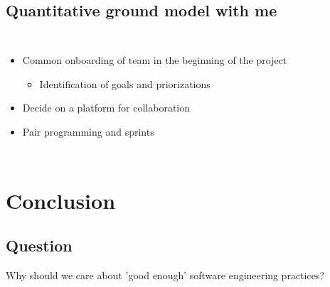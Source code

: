 \documentclass[usenames,dvipsnames]{beamer}
\theoremstyle{plain}
\theoremstyle{definition}
\begin{document}
\subsection{Quantitative ground model with me}

\begin{frame}{\setframetitle{}}
  \begin{columns}[t]
    
    \begin{itemize}
      \item Common onboarding of team in the beginning of the project 
      \begin{itemize}
        \item Identification of goals and priorizations 
      \end{itemize}
      
      \item Decide on a platform for collaboration
      
      \item Pair programming and sprints 
      
      
    \end{itemize}
  
  \end{columns}
  
\end{frame}







\section{Conclusion}
\subsection{Question}


\begin{frame}{\setframetitle{}}
  {
\centering


\Large  Why should we care about 'good enough' software engineering practices?

}
\end{frame}
\end{document}

